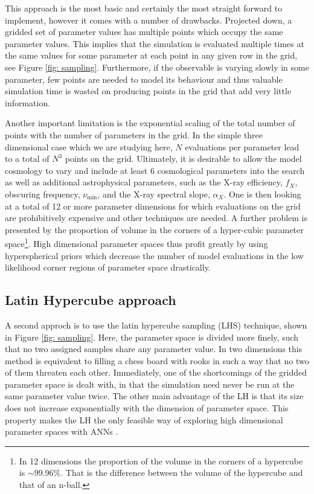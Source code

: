 \documentclass[useAMS,usenatbib]{mnras}
\begin{document}
This approach is the most basic and certainly the most straight forward to implement, however it comes with a number of drawbacks. 
Projected down, a gridded set of parameter values has multiple points which occupy the same parameter values.  
This implies that the simulation is evaluated multiple times at the same values for some parameter at each point in any given row in the grid, see Figure \ref{fig: sampling}. 
Furthermore, if the observable is varying slowly in some parameter, few points are needed to model its behaviour and thus valuable simulation time is wasted on producing points in the grid that add very little information.

Another important limitation is the exponential scaling of the total number of points with the number of parameters in the grid.
In the simple three dimensional case which we are studying here, $N$ evaluations per parameter lead to a total of $N^3$ points on the grid. 
Ultimately, it is desirable to allow the model cosmology to vary and include at least 6 cosmological parameters into the search as well as additional astrophysical parameters, such as the X-ray efficiency, $f_X$, obscuring frequency, $\nu_\text{min}$, and the X-ray spectral slope, $\alpha_X$. 
One is then looking at a total of 12 or more parameter dimensions for which evaluations on the grid are prohibitively expensive and other techniques are needed.
A further problem is presented by the proportion of volume in the corners of a hyper-cubic parameter space\footnote{In 12 dimensions the proportion of the volume in the corners of a hypercube is $\sim 99.96\%$. 
That is the difference between the volume of the hypercube and that of an n-ball.}. 
High dimensional parameter spaces thus profit greatly by using hyperspherical priors which decrease the number of model evaluations in the low likelihood corner regions of parameter space drastically.


\subsection{Latin Hypercube approach}\label{sec: LHC}
A second approch is to use the latin hypercube sampling (LHS) technique, shown in Figure \ref{fig: sampling}. 
Here, the parameter space is divided more finely, such that no two assigned samples share any parameter value.
In two dimensions this method is equivalent to filling a chess board with rooks in such a way that no two of them threaten each other. 
Immediately, one of the shortcomings of the gridded parameter space is dealt with, in that the simulation need never be run at the same parameter value twice. 
The other main advantage of the LH is that its size does not increase exponentially with the dimension of parameter space.
This property makes the LH the only feasible way of exploring high dimensional parameter spaces with ANNs \citep{Urban2010}. 
\end{document}
